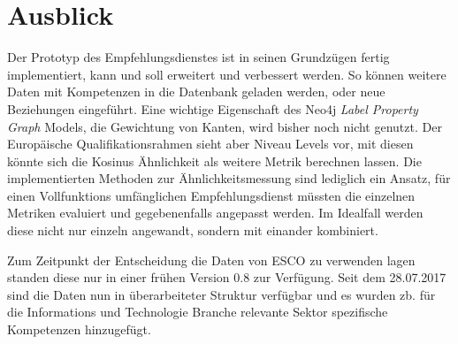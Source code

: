 \section{Ausblick}\label{ausblick}

Der Prototyp des Empfehlungsdienstes ist in seinen Grundzügen fertig implementiert, kann und soll erweitert und verbessert werden. So können weitere Daten mit Kompetenzen in die Datenbank geladen werden, oder neue Beziehungen eingeführt. Eine wichtige Eigenschaft des Neo4j \textit{Label Property Graph} Models, die Gewichtung von Kanten, wird bisher noch nicht genutzt. Der Europäische Qualifikationsrahmen sieht aber Niveau Levels vor, mit diesen könnte sich die Kosinus Ähnlichkeit als weitere Metrik berechnen lassen. 
Die implementierten Methoden zur Ähnlichkeitsmessung sind lediglich ein Ansatz, für einen Vollfunktions umfänglichen Empfehlungsdienst müssten die einzelnen Metriken evaluiert und gegebenenfalls angepasst werden. Im Idealfall werden diese nicht nur einzeln angewandt, sondern mit einander kombiniert. 

  Zum Zeitpunkt der Entscheidung die Daten von ESCO zu verwenden lagen standen diese nur in einer frühen Version 0.8 zur Verfügung. Seit dem 28.07.2017 sind die Daten nun in überarbeiteter Struktur verfügbar und es wurden zb. für die Informations und Technologie Branche relevante Sektor spezifische Kompetenzen hinzugefügt. 